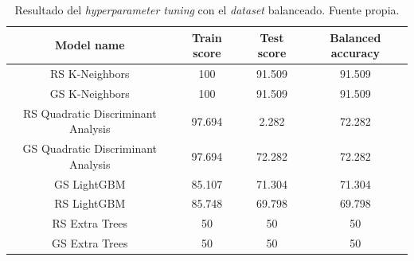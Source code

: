 \begin{table}[!ht]
    \centering
    \begin{tabular}{|c|ccc|} \hline
        Model name & Train score & Test score & Balanced accuracy \\ \hline
        RS K-Neighbors & 100 & 91.509 & 91.509 \\ 
        GS K-Neighbors & 100 & 91.509 & 91.509 \\ 
        RS Quadratic Discriminant Analysis & 97.694 &2.282 & 72.282 \\ 
        GS Quadratic Discriminant Analysis & 97.694 & 72.282 & 72.282 \\ 
        GS LightGBM & 85.107 & 71.304 & 71.304 \\ 
        RS LightGBM & 85.748 & 69.798 & 69.798 \\ 
        RS Extra Trees & 50 & 50 & 50 \\ 
        GS Extra Trees & 50 & 50 & 50 \\ \hline
    \end{tabular}
    \caption{Resultado del \textit{hyperparameter tuning} con el \textit{dataset} balanceado. Fuente propia.}\ \label{tab:hyperparameter-tuning-results-v2}
\end{table}